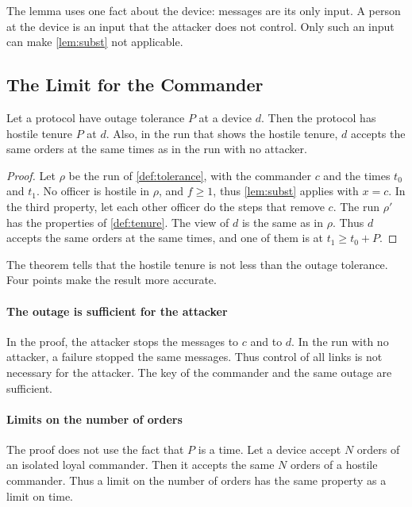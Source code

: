 The lemma uses one fact about the device: messages are its only input. A person at the
device is an input that the attacker does not control. Only such an input can make
\cref{lem:subst} not applicable.

\subsection{The Limit for the Commander}

\begin{thm}
\label{thm:limit}
Let a protocol have outage tolerance $P$ at a device $d$. Then the protocol has hostile
tenure $P$ at $d$. Also, in the run that shows the hostile tenure, $d$ accepts the same
orders at the same times as in the run with no attacker.
\end{thm}

\begin{proof}
Let $\rho$ be the run of \cref{def:tolerance}, with the commander $c$ and the times $t_0$
and $t_1$. No officer is hostile in $\rho$, and $f \ge 1$, thus \cref{lem:subst} applies
with $x = c$. In the third property, let each other
officer do the steps that remove $c$. The run $\rho'$ has the properties of
\cref{def:tenure}. The view of $d$ is the same as in $\rho$. Thus $d$ accepts the same
orders at the same times, and one of them is at $t_1 \ge t_0 + P$.
\end{proof}

The theorem tells that the hostile tenure is not less than the outage tolerance. Four
points make the result more accurate.

\paragraph{The outage is sufficient for the attacker}
In the proof, the attacker stops the messages to $c$ and to $d$. In the run with no
attacker, a failure stopped the same messages. Thus control of all links is not
necessary for the attacker. The key of the commander and the same outage are sufficient.

\paragraph{Limits on the number of orders}
The proof does not use the fact that $P$ is a time. Let a device accept $N$ orders of an
isolated loyal commander. Then it accepts the same $N$ orders of a hostile commander. Thus
a limit on the number of orders has the same property as a limit on time.

